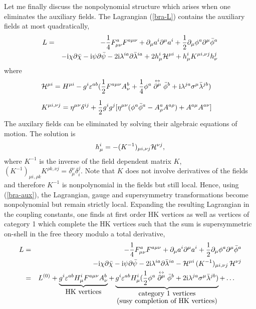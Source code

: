 \documentclass[a4paper,12pt]{article}
\begin{document}
Let me finally discuss the nonpolynomial structure
which arises when one
eliminates the auxiliary fields.
The Lagrangian (\ref{bra-L}) contains the auxiliary fields at most
quadratically,
\begin{eqnarray*}
L&=&-\frac 14 F^a_{\mu\nu}F^{a\mu\nu}
+\partial _\mu a^i \partial ^\mu a^i
+\frac 12 \partial _\mu\phi^a\partial ^\mu \bar \phi^a
\\
&&-{\mathrm{i}} \chi\partial \bar \chi-{\mathrm{i}}\psi\partial \bar \psi
-2{\mathrm{i}}\lambda^{ia}\partial  \bar \lambda^{ia}
+2{h_\mu^i} {\cal H}^{\mu i}
+{h_\mu^i}K^{\mu i,\nu j} {h_\nu^j}
\end{eqnarray*}
where
\begin{eqnarray*}
&{\cal H}^{\mu i}=H^{\mu i}
-{g^i}\varepsilon^{ab}(\frac 12 F^{a\mu\nu}A_\nu^b 
+\frac 14\phi^a \stackrel{\!\leftrightarrow\!}{\partial ^\mu}\bar \phi^b
+{\mathrm{i}} \lambda^{ja}\sigma^\mu\bar \lambda^{jb})&
\\[6pt]
&K^{\mu i,\nu j}=
\eta^{\mu\nu}\delta^{ij}+\frac 12 {g^i g^j}
[\eta^{\mu\nu}(\phi^a\bar \phi^a-A_\rho^a A^{a\rho})+A^{a\mu}A^{a\nu}]&
\end{eqnarray*}
The auxilary fields can be eliminated by solving their
algebraic equations of motion. The solution is
\begin{equation}
{h_\mu^i}=-(K^{-1})_{\mu i,\nu j}{\cal H}^{\nu j},
\label{bra-aux}
\end{equation}
where $K^{-1}$ is the inverse of the field dependent matrix $K$,
$(K^{-1})_{\mu i,\rho k}K^{\rho k,\nu j}=\delta^\nu_\mu\delta^j_i$.
Note that $K$ does not involve derivatives of the fields and therefore
$K^{-1}$ is nonpolynomial in the fields but still local.
Hence, using (\ref{bra-aux}),
the Lagrangian, gauge and supersymmetry transformations become
nonpolynomial but remain strictly local. Expanding the
resulting Lagrangian in the coupling constants, one finds at
first order HK vertices as well as vertices of category 1
which complete the HK vertices such that the sum is supersymmetric
on-shell in the free theory modulo a total derivative,
\begin{eqnarray}
L&=&-\frac 14 F^a_{\mu\nu}F^{a\mu\nu}
+\partial _\mu a^i \partial ^\mu a^i
+\frac 12 \partial _\mu\phi^a\partial ^\mu \bar \phi^a
\nonumber\\
&&-{\mathrm{i}} \chi\partial \bar \chi-{\mathrm{i}}\psi\partial \bar \psi
-2{\mathrm{i}}\lambda^{ia}\partial  \bar \lambda^{ia}
-{\cal H}^{\mu i}\,(K^{-1})_{\mu i,\nu j}\, {\cal H}^{\nu j}
\nonumber\\
&=&
L^{(0)}+\underbrace{
{g^i}\varepsilon^{ab}H_{\mu}^iF^{a\mu\nu}A_\nu^b}_{\mbox{HK vertices}}
+\underbrace{{g^i}\varepsilon^{ab}H_{\mu}^i(\frac 12\phi^a 
\stackrel{\!\leftrightarrow\!}{\partial ^\mu}\bar \phi^b
+2{\mathrm{i}} \lambda^{ja}\sigma^\mu
\bar \lambda^{jb})}_{\mbox{category 1 vertices}
\atop
\mbox{(susy completion of HK vertices)}}+\dots\quad
\label{bra-exp}\end{eqnarray}
\end{document}
